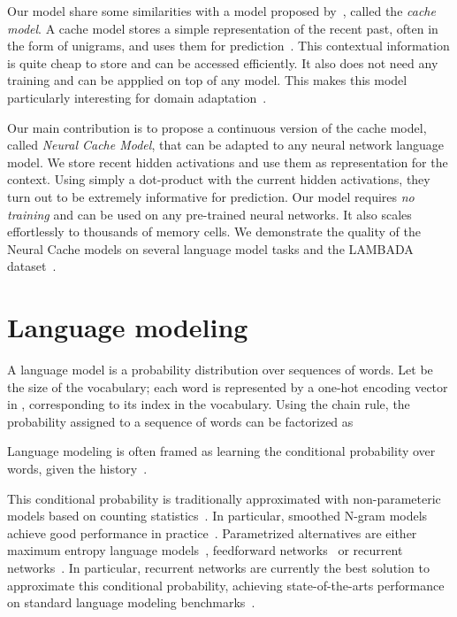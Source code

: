 \documentclass{article} \usepackage{iclr2017_conference,times}
\begin{document}
Our model share some similarities with a model proposed
by~\citet{kuhn1988speech}, called the \emph{cache model}. A cache model stores a
simple representation of the recent past, often in the form of unigrams, and uses
them for prediction~\citep{kuhn1990cache}. This contextual information
is quite cheap to store and can be accessed efficiently. It also does not need
any training and can be appplied on top of any model. This makes this model particularly
interesting for domain adaptation~\citep{kneser1993dynamic}.

Our main contribution is to propose a continuous version of the cache model, called \emph{Neural Cache Model},
that can be adapted to any neural network language model. We store recent hidden activations and use
them as representation for the context. Using simply a dot-product with the current hidden activations, they
turn out to be extremely informative for prediction. Our model requires \emph{no training} and can be used
on any pre-trained neural networks. It also scales effortlessly to thousands of memory cells.
We demonstrate the quality of the Neural Cache models on several language model tasks and the LAMBADA dataset~\citep{paperno2016lambada}.
 
\section{Language modeling}

A language model is a probability distribution over sequences of words.
Let  be the size of the vocabulary; each word is represented by a one-hot
encoding vector  in , corresponding to its index in
the vocabulary.
Using the chain rule, the probability assigned to a sequence of words  can be factorized as

Language modeling is often framed as learning the conditional probability over words, given the history~\citep{bahl1983maximum}.

This conditional probability is traditionally approximated with non-parameteric models based on counting statistics~\citep{goodman2001bit}.
In particular, smoothed N-gram
models~\citep{katz1987estimation,kneser1995improved} achieve good performance
in practice~\citep{mikolov2011empirical}. Parametrized alternatives are either
maximum entropy language models~\citep{rosenfeld1996maximum},
feedforward networks~\citep{bengio2003neural} or  recurrent
networks~\citep{mikolov2010recurrent}. In particular, recurrent networks are
currently the best solution to approximate this conditional probability,
achieving state-of-the-arts performance on standard language
modeling benchmarks~\citep{jozefowicz2016exploring,zilly2016recurrent}.
\end{document}
